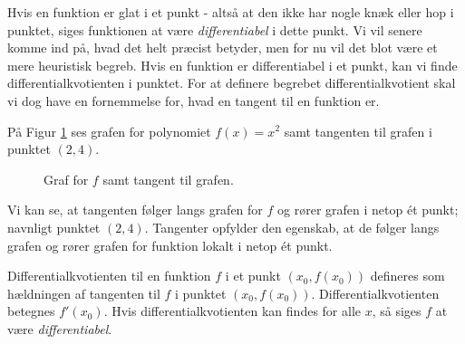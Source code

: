 Hvis en funktion er glat i et punkt - altså at den ikke har nogle knæk eller hop i punktet, siges funktionen at være \textit{differentiabel} i dette punkt. Vi vil senere komme ind på, hvad det helt præcist betyder, men for nu vil det blot være et mere heuristisk begreb. Hvis en funktion er differentiabel i et punkt, kan vi finde differentialkvotienten i punktet. For at definere begrebet differentialkvotient skal vi dog have en fornemmelse for, hvad en tangent til en funktion er.

\newpage
\begin{exa}
	På Figur \ref{fig:tangent} ses grafen for polynomiet $f(x) = x^2$ samt tangenten til grafen i punktet 
	$(2,4)$. 
	\begin{figure}[H]
		\centering
		\caption{Graf for $f$ samt tangent til grafen.}
		\label{fig:tangent}
	\end{figure}	 
	Vi kan se, at tangenten følger langs grafen for $f$ og rører grafen i netop ét punkt; navnligt punktet
	$(2,4)$. Tangenter opfylder den egenskab, at de følger langs grafen og rører grafen for funktion 
	lokalt i netop ét punkt.
\end{exa}
\begin{defn}[Differentialkvotient]
	Differentialkvotienten til en funktion $f$ i et punkt $(x_0,f(x_0))$ defineres som hældningen af tangenten 
	til $f$ i punktet $(x_0,f(x_0))$. Differentialkvotienten betegnes $f'(x_0)$. Hvis 
	differentialkvotienten kan findes for alle $x$, så siges $f$ at være \textit{differentiabel}.
\end{defn}
